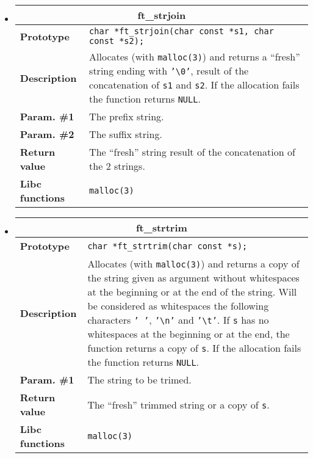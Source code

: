 \documentclass{42-en}
\begin{document}
\begin{itemize}
            \item \begin{tabular}{|l|p{11cm}|}
                \hline
                \multicolumn{2}{|c|}{\textbf{ft\_strjoin}}\\
                \hline
                \textbf{Prototype} &
                \texttt{char *\hspace{5mm}ft\_strjoin(char const *s1,
                  char const *s2);}\\
                \hline
                \textbf{Description} & Allocates (with
                \texttt{malloc(3)}) and returns a ``fresh'' string ending
                with \texttt{'\textbackslash{}0'}, result of the concatenation of
                \texttt{s1} and \texttt{s2}. If the allocation fails
                the function returns \texttt{NULL}.\\
                \hline
                \textbf{Param. \#1} & The prefix string.\\
                \hline
                \textbf{Param. \#2} & The suffix string.\\
                \hline
                \textbf{Return value} & The ``fresh'' string result of
                the concatenation of the 2 strings.\\
                \hline
                \textbf{Libc functions} & \texttt{malloc(3)}\\
                \hline
            \end{tabular}

            \item \begin{tabular}{|l|p{11cm}|}
                \hline
                \multicolumn{2}{|c|}{\textbf{ft\_strtrim}}\\
                \hline
                \textbf{Prototype} &
                \texttt{char *\hspace{5mm}ft\_strtrim(char const *s);}\\
                \hline
                \textbf{Description} & Allocates (with
                \texttt{malloc(3)}) and returns a copy of the string
                given as argument without whitespaces at the beginning or
                at the end of the string. Will be considered as whitespaces
                the following characters \texttt{' '},
                \texttt{'\textbackslash{}n'} and
                \texttt{'\textbackslash{}t'}. If \texttt{s} has no whitespaces
                at the beginning or at the end, the function returns
                a copy of \texttt{s}. If the allocation fails the function returns
                \texttt{NULL}.\\
                \hline
                \textbf{Param. \#1} & The string to be trimed.\\
                \hline
                \textbf{Return value} & The ``fresh'' trimmed string or
                a copy of \texttt{s}.\\
                \hline
                \textbf{Libc functions} & \texttt{malloc(3)}\\
                \hline
            \end{tabular}


\end{itemize}
\end{document}
